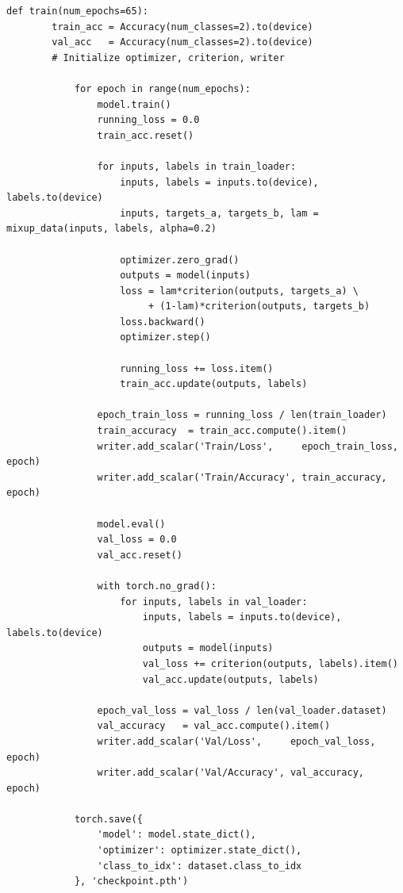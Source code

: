     \begin{lstlisting}[style=pythonstyle, caption={Core training and validation loop}, label=lst:train_loop]
    def train(num_epochs=65):
        train_acc = Accuracy(num_classes=2).to(device)
        val_acc   = Accuracy(num_classes=2).to(device)
        # Initialize optimizer, criterion, writer
        
            for epoch in range(num_epochs):
                model.train()
                running_loss = 0.0
                train_acc.reset()
        
                for inputs, labels in train_loader:
                    inputs, labels = inputs.to(device), labels.to(device)
                    inputs, targets_a, targets_b, lam = mixup_data(inputs, labels, alpha=0.2)
        
                    optimizer.zero_grad()
                    outputs = model(inputs)
                    loss = lam*criterion(outputs, targets_a) \
                         + (1-lam)*criterion(outputs, targets_b)
                    loss.backward()
                    optimizer.step()
        
                    running_loss += loss.item()
                    train_acc.update(outputs, labels)
        
                epoch_train_loss = running_loss / len(train_loader)
                train_accuracy  = train_acc.compute().item()
                writer.add_scalar('Train/Loss',     epoch_train_loss, epoch)
                writer.add_scalar('Train/Accuracy', train_accuracy,   epoch)
        
                model.eval()
                val_loss = 0.0
                val_acc.reset()
        
                with torch.no_grad():
                    for inputs, labels in val_loader:
                        inputs, labels = inputs.to(device), labels.to(device)
                        outputs = model(inputs)
                        val_loss += criterion(outputs, labels).item()
                        val_acc.update(outputs, labels)
        
                epoch_val_loss = val_loss / len(val_loader.dataset)
                val_accuracy   = val_acc.compute().item()
                writer.add_scalar('Val/Loss',     epoch_val_loss, epoch)
                writer.add_scalar('Val/Accuracy', val_accuracy,   epoch)
        
            torch.save({
                'model': model.state_dict(),
                'optimizer': optimizer.state_dict(),
                'class_to_idx': dataset.class_to_idx
            }, 'checkpoint.pth')
        \end{lstlisting}

